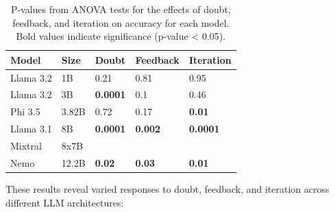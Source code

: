 \begin{table}[h]
    \centering
    \small 
    \begin{tabular}{|l|l|l|l|l|}
        \hline
        \textbf{Model} & \textbf{Size} & \textbf{Doubt} & \textbf{Feedback} & \textbf{Iteration} \\
        \hline
        Llama 3.2 & 1B & 0.21 & 0.81 & 0.95 \\
        Llama 3.2 & 3B & \textbf{0.0001} & 0.1 & 0.46 \\
        Phi 3.5 & 3.82B & 0.72 & 0.17 & \textbf{0.01}\\
        Llama 3.1 & 8B & \textbf{0.0001} & \textbf{0.002} & \textbf{0.0001} \\
        Mixtral & 8x7B & & & \\
        Nemo & 12.2B & \textbf{0.02} & \textbf{0.03} & \textbf{0.01}\\
        \hline
    \end{tabular}
    \caption{P-values from ANOVA tests for the effects of doubt, feedback, and iteration on accuracy for each model. Bold values indicate significance (p-value < 0.05).}
    \label{rep: p-value}
\end{table}

These results reveal varied responses to doubt, feedback, and iteration across different LLM architectures:

